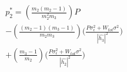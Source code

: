 \documentclass[preview]{standalone}
\begin{document}
\begin{align*}
p_2^\ast = \left(\frac{m_2(m_2 - 1)}{m_2^2 m_3}\right) P \\ - \left(\frac{(m_2 - 1)(m_3 - 1)}{m_2 m_3}\right) \Bigg( \frac{P \sigma_\epsilon^2 + W_{tot} \sigma^2 }{ \left| \hat{h_3} \right| ^2 } \Bigg) \\ + \left(\frac{m_3 - 1}{m_2}\right) \Bigg( \frac{P \sigma_\epsilon^2 + W_{tot} \sigma^2}{\left|\hat{h_2}\right|^2} \Bigg)
\end{align*}
\end{document}
